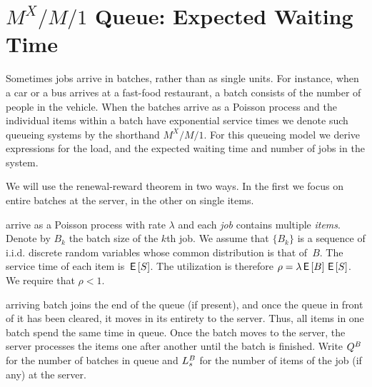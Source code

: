 


\section{$M^X/M/1$ Queue: Expected Waiting Time}
\label{sec:mxm1-queue:-expected}

Sometimes jobs arrive in batches, rather than as single units.
For instance, when a car or a bus arrives at a fast-food restaurant, a batch consists of the number of people in the vehicle.
When the batches arrive as a Poisson process and the individual items within a batch have exponential service times we denote such queueing systems by the shorthand $M^X/M/1$.
For this queueing model we derive expressions for the load, and the expected waiting time and number of jobs in the system.

We will use the renewal-reward theorem in two ways. In the first we focus on entire batches at the server, in the other on single items. 


 arrive as a Poisson process with rate $\lambda$ and each \emph{job} contains multiple \emph{items}.
Denote by $B_k$ the batch size of the $k$th job.
We assume that $\{B_k\}$ is a sequence of i.i.d. discrete random variables whose common distribution is that of~$B$.
The service time of each item is $\,\mathsf{E}\left[S\right]$. The utilization is therefore
$\rho = \lambda \,\mathsf{E}\left[B\right] \,\mathsf{E}\left[S\right]$.
We require that $\rho<1$.


 arriving batch joins the end of the queue (if present), and once the queue in front of it has been cleared, it moves in its entirety to the server.
Thus, all items in one batch spend the same time in queue.
Once the batch moves to the server, the server processes the items one after another until the batch is finished.
Write $Q^B$ for the number of batches in queue and $L_s^B$ for the number of items of the job (if any) at the server.


